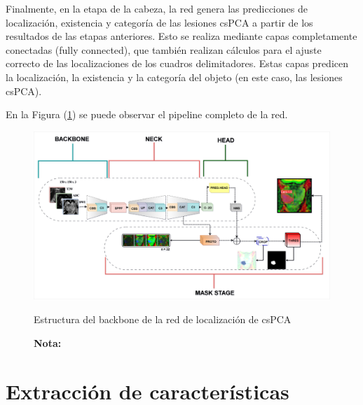 Finalmente, en la etapa de la cabeza, la red genera las predicciones de localización, existencia y categoría de las lesiones csPCA a partir de los resultados de las etapas anteriores. Esto se realiza mediante capas completamente conectadas (fully connected), que también realizan cálculos para el ajuste correcto de las localizaciones de los cuadros delimitadores. Estas capas predicen la localización, la existencia y la categoría del objeto (en este caso, las lesiones csPCA).

En la Figura (\ref{fig:pipeline}) se puede observar el pipeline completo de la red.\par



\begin{figure}[h!]
	\centering
	\caption{Estructura del backbone de la red de localización de csPCA}
	\includegraphics[width=1\textwidth]{imgs/pip_3.png}
	\label{fig:pipeline}
\end{figure}

\begin{figure}[h!]
	\noindent \textbf{Nota:} 
\end{figure}

\par
\section{Extracción de características}

